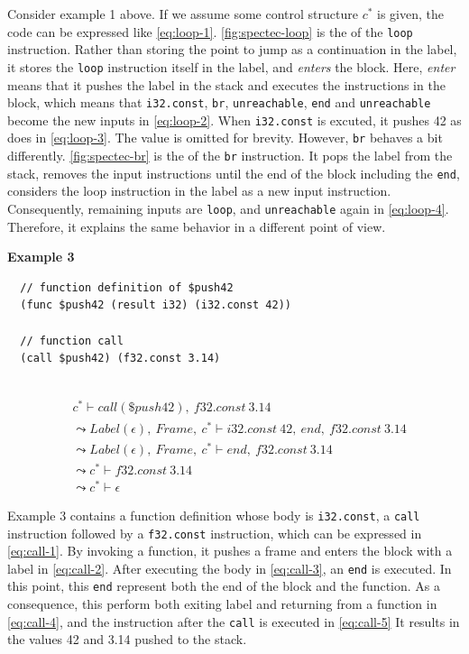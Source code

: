 Consider example 1 above.
If we assume some control structure $c^*$ is given, the code can be expressed
like \cref{eq:loop-1}.
\cref{fig:spectec-loop} is the \spectecp{} of the \texttt{loop} instruction.
Rather than storing the point to jump as a continuation in the label, it stores
the \texttt{loop} instruction itself in the label, and \textit{enters} the
block.
Here, \textit{enter} means that it pushes the label in the stack and executes
the instructions in the block, which means that \texttt{i32.const},
\texttt{br}, \texttt{unreachable}, \texttt{end} and \texttt{unreachable} become
the new inputs in \cref{eq:loop-2}.
When \texttt{i32.const} is excuted, it pushes 42 as \officialp{} does
in \cref{eq:loop-3}.
The value is omitted for brevity.
However, \texttt{br} behaves a bit differently.
\cref{fig:spectec-br} is the \spectecp{} of the \texttt{br} instruction.
It pops the label from the stack, removes the input instructions until the end
of the block including the \texttt{end}, considers the loop instruction in the
label as a new input instruction.
Consequently, remaining inputs are \texttt{loop}, and \texttt{unreachable}
again in \cref{eq:loop-4}.
Therefore, it explains the same behavior in a different point of view.


\textbf{Example 3}
\begin{verbatim}
  // function definition of $push42
  (func $push42 (result i32) (i32.const 42))

  // function call
  (call $push42) (f32.const 3.14)
\end{verbatim}

 \\
\begin{align}
  &c^* \vdash call(\$push42), ~ f32.const ~ 3.14 \label{eq:call-1} \\
&\leadsto
  Label(\epsilon), ~ Frame, ~ c^* \vdash i32.const ~ 42, ~ end, ~ f32.const ~ 3.14 \label{eq:call-2} \\
&\leadsto
  Label(\epsilon), ~ Frame, ~ c^* \vdash end, ~ f32.const ~ 3.14 \label{eq:call-3} \\
&\leadsto
  c^* \vdash f32.const ~ 3.14 \label{eq:call-4} \\
&\leadsto
  c^* \vdash \epsilon \label{eq:call-5}
\end{align}

Example 3 contains a function definition whose body is \texttt{i32.const}, a
\texttt{call} instruction followed by a \texttt{f32.const} instruction, which
can be expressed in \cref{eq:call-1}.
By invoking a function, it pushes a frame and enters the block with a label in
\cref{eq:call-2}.
After executing the body in \cref{eq:call-3}, an \texttt{end} is executed.
In this point, this \texttt{end} represent both the end of the block and the
function.
As a consequence, this  perform both exiting label and returning from
a function in \cref{eq:call-4}, and the instruction after the \texttt{call} is
executed in \cref{eq:call-5}
It results in the values 42 and 3.14 pushed to the stack.


